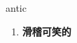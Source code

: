 
\begin{frame}
{\huge antic}
\begin{center}
\begin{enumerate}\Large
  \item \textbf{滑稽可笑的}
\end{enumerate}
\end{center}
\end{frame}
